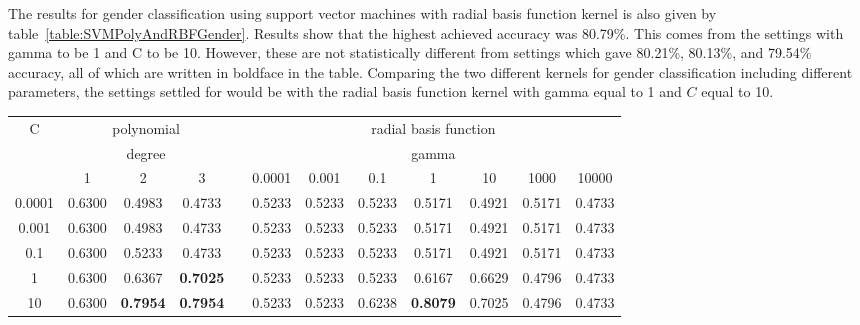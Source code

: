 \documentclass[a4paper]{llncs}
\begin{document}
The results for gender classification using support vector machines with radial basis function kernel is also given by table~\ref{table:SVMPolyAndRBFGender}. Results show  that the highest achieved accuracy was 80.79\%. This comes from the settings with gamma to be 1 and C to be 10. However, these are not statistically different from settings which gave 80.21\%, 80.13\%, and 79.54\% accuracy, all of which are written in boldface in the table. Comparing the two different kernels for gender classification including different parameters, the settings settled for would be with the radial basis function kernel with gamma equal to 1 and $C$ equal to 10.  

\begin{table}[!htbp]
\centering
\begin{tabular}{|c|ccc|c|ccccccc|}
\cline{1-4} \cline{6-12}
\multirow{3}{*}{C} & \multicolumn{3}{c|}{polynomial}            &  & \multicolumn{7}{c|}{radial basis function}                                              \\ \cline{2-4} \cline{6-12} 
                   & \multicolumn{3}{c|}{degree}                &  & \multicolumn{7}{c|}{gamma}                                                              \\ %
                   & 1      & 2               & 3               &  & 0.0001 & 0.001           & 0.1             & 1               & 10     & 1000   & 10000  \\ \cline{1-4} \cline{6-12} 
0.0001             & 0.6300 & 0.4983          & 0.4733          &  & 0.5233 & 0.5233          & 0.5233          & 0.5171          & 0.4921 & 0.5171 & 0.4733 \\ %
0.001              & 0.6300 & 0.4983          & 0.4733          &  & 0.5233 & 0.5233          & 0.5233          & 0.5171          & 0.4921 & 0.5171 & 0.4733 \\ %
0.1                & 0.6300 & 0.5233          & 0.4733          &  & 0.5233 & 0.5233          & 0.5233          & 0.5171          & 0.4921 & 0.5171 & 0.4733 \\ %
1                  & 0.6300 & 0.6367          & \textbf{0.7025} &  & 0.5233 & 0.5233          & 0.5233          & 0.6167          & 0.6629 & 0.4796 & 0.4733 \\ %
10                 & 0.6300 & \textbf{0.7954} & \textbf{0.7954} &  & 0.5233 & 0.5233          & 0.6238          & \textbf{0.8079} & 0.7025 & 0.4796 & 0.4733 \\ %

\end{tabular}
\end{table}
\end{document}

